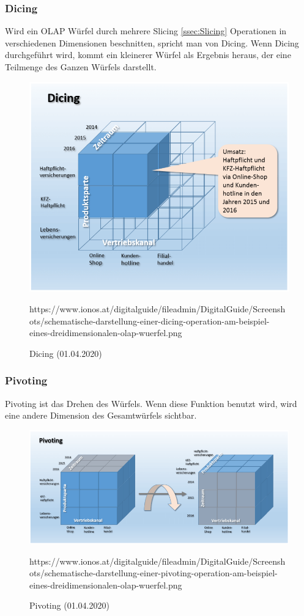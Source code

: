 \subsubsection{Dicing}\label{ssec:Dicing}
Wird ein OLAP Würfel durch mehrere Slicing \ref{ssec:Slicing} Operationen in verschiedenen Dimensionen beschnitten, spricht man von Dicing. Wenn Dicing durchgeführt wird, kommt ein kleinerer Würfel als Ergebnis heraus, der eine Teilmenge des Ganzen Würfels darstellt.
\begin{figure}[H]
\centering
  \includegraphics[scale=0.4]{images/Dicing.png}
  \caption[Dicing (01.04.2020)]{Dicing (01.04.2020)}
  {https://www.ionos.at/digitalguide/fileadmin/DigitalGuide/Screenshots/schematische-darstellung-einer-dicing-operation-am-beispiel-eines-dreidimensionalen-olap-wuerfel.png}
  \label{fig:Dicing}
\end{figure}
\newpage
\subsubsection{Pivoting}\label{ssec:Pivoting}
Pivoting ist das Drehen des Würfels. Wenn diese Funktion benutzt wird, wird eine andere Dimension des Gesamtwürfels sichtbar.
\begin{figure}[H]
\centering
  \includegraphics[scale=0.33]{images/Pivoting.png}
  \caption[Pivoting (01.04.2020)]{Pivoting (01.04.2020)}
  {https://www.ionos.at/digitalguide/fileadmin/DigitalGuide/Screenshots/schematische-darstellung-einer-pivoting-operation-am-beispiel-eines-dreidimensionalen-olap-wuerfel.png}
  \label{fig:Pivoting}
\end{figure}
